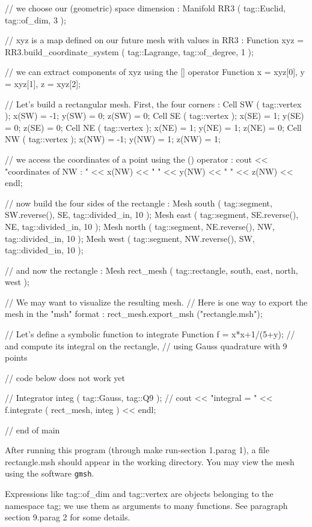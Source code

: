 {  // we choose our (geometric) space dimension :
   Manifold RR3 ( tag::Euclid, tag::of_dim, 3 );
   
   // xyz is a map defined on our future mesh with values in RR3 :
   Function xyz = RR3.build_coordinate_system ( tag::Lagrange, tag::of_degree, 1 );

   // we can extract components of xyz using the [] operator
   Function x = xyz[0],  y = xyz[1],  z = xyz[2];

   // Let's build a rectangular mesh. First, the four corners :
   Cell SW ( tag::vertex );  x(SW) = -1;  y(SW) = 0;  z(SW) = 0;
   Cell SE ( tag::vertex );  x(SE) =  1;  y(SE) = 0;  z(SE) = 0;
   Cell NE ( tag::vertex );  x(NE) =  1;  y(NE) = 1;  z(NE) = 0;
   Cell NW ( tag::vertex );  x(NW) = -1;  y(NW) = 1;  z(NW) = 1;
   
   // we access the coordinates of a point using the () operator :
   cout << "coordinates of NW : " << x(NW) << " " << y(NW) << " " << z(NW) << endl;
   
   // now build the four sides of the rectangle :
   Mesh south ( tag::segment, SW.reverse(), SE, tag::divided_in, 10 );
   Mesh east  ( tag::segment, SE.reverse(), NE, tag::divided_in, 10 );
   Mesh north ( tag::segment, NE.reverse(), NW, tag::divided_in, 10 );
   Mesh west  ( tag::segment, NW.reverse(), SW, tag::divided_in, 10 );
   
   // and now the rectangle :
   Mesh rect_mesh ( tag::rectangle, south, east, north, west );

   // We may want to visualize the resulting mesh.
   // Here is one way to export the mesh in the "msh" format :
   rect_mesh.export_msh ("rectangle.msh");

   // Let's define a symbolic function to integrate
   Function f = x*x+1/(5+y);
   // and compute its integral on the rectangle,
   // using Gauss quadrature with 9 points

   // code below does not work yet

   // Integrator integ ( tag::Gauss, tag::Q9 );
   // cout << "integral = " << f.integrate ( rect_mesh, integ ) << endl;

}  // end of main
\endverbatim

After running this program (through {\codett make run-\numb section 1.\numb parag 1}), a file
{\codett rectangle.msh} should appear in the working directory.
You may view the mesh using the software {\tt gmsh}.

Expressions like {\codett tag::of\_dim} and {\codett tag::vertex} are
objects belonging to the {\codett namespace tag}; we use them as arguments to many functions.
See paragraph \numb section 9.\numb parag 2 for some details.

